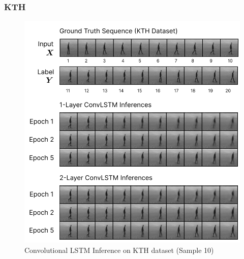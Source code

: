 \documentclass{scrartcl}
\begin{document}
\subsubsection{KTH}
\label{subsubsec:kth}

\begin{figure}[H]
	\begin{center}
		\includegraphics[width=1\textwidth]{inferences/kth/kth_inferences.png}
	\end{center}
	\caption{Convolutional LSTM Inference on KTH dataset (Sample 10)}
	\label{inf:lstm_kth_inference}
\end{figure}
\end{document}
